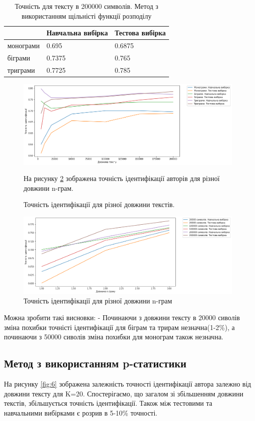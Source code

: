 \documentclass[12pt, a4paper]{extarticle}
\begin{document}
\begin{center}
\begin{table}
\begin{tabular}{|p{5em}|p{10em}|p{10em}|}
\hline
& Навчальна вибірка & Тестова вибірка\\
\hline
монограми & 0.695 & 0.6875\\
біграми & 0.7375 & 0.765\\
триграми & 0.7725 & 0.785\\
\hline
\end{tabular}
\caption{Точність для тексту в 200000 символів. Метод з використанням щільністі функції розподілу}
\label{tab:4}
\end{table}
\end{center}
\begin{figure}
\includegraphics[width=\linewidth]{figures/4.png}
\centering
\caption{Точність ідентифікації для різної довжини текстів.}
\label{fig:4}
На рисунку \ref{fig:5} зображена точність ідентифікації авторів для різної довжини n-грам. 
\end{figure}
\begin{figure}
\includegraphics[width=\linewidth]{figures/5.png}
\centering
\caption{Точність ідентифікації для різної довжини n-грам}
\label{fig:5}
\end{figure}
Можна зробити такі висновки:
- Починаючи з довжини тексту в 20000 сиволів зміна похибки точністі ідентифікації для біграм та трирам  незначна(1-2\%), а починаючи з 50000 сиволів зміна похибки для монограм також незначна.
\subsection{Метод з використанням p-статистики}
На рисунку \ref{fig:6} зображена залежність точності ідентифікації автора залежно від довжини тексту для K=20. Спостерігаємо, що загалом зі збільшенням довжини текстів, збільшується точність ідентифікації. Також між тестовими та навчальними вибірками є розрив в 5-10\% точності.
\end{document}
